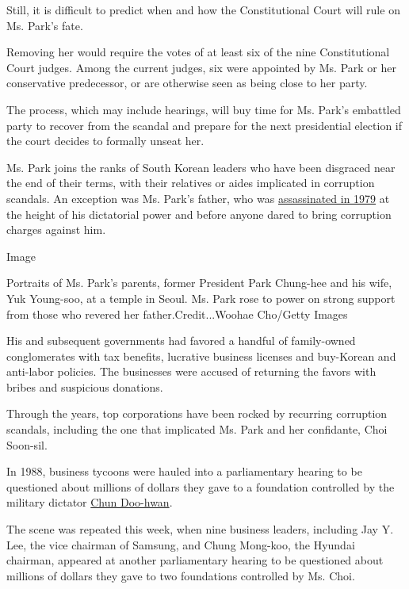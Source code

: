 Still, it is difficult to predict when and how the Constitutional Court
will rule on Ms. Park's fate.

Removing her would require the votes of at least six of the nine
Constitutional Court judges. Among the current judges, six were
appointed by Ms. Park or her conservative predecessor, or are otherwise
seen as being close to her party.

The process, which may include hearings, will buy time for Ms. Park's
embattled party to recover from the scandal and prepare for the next
presidential election if the court decides to formally unseat her.

Ms. Park joins the ranks of South Korean leaders who have been disgraced
near the end of their terms, with their relatives or aides implicated in
corruption scandals. An exception was Ms. Park's father, who was
\href{http://www.nytimes.com/1979/10/27/archives/president-park-is-slain-in-korea-by-intelligence-chief-seoul-says.html}{assassinated
in 1979} at the height of his dictatorial power and before anyone dared
to bring corruption charges against him.

Image

Portraits of Ms. Park's parents, former President Park Chung-hee and his
wife, Yuk Young-soo, at a temple in Seoul. Ms. Park rose to power on
strong support from those who revered her father.Credit...Woohae
Cho/Getty Images

His and subsequent governments had favored a handful of family-owned
conglomerates with tax benefits, lucrative business licenses and
buy-Korean and anti-labor policies. The businesses were accused of
returning the favors with bribes and suspicious donations.

Through the years, top corporations have been rocked by recurring
corruption scandals, including the one that implicated Ms. Park and her
confidante, Choi Soon-sil.

In 1988, business tycoons were hauled into a parliamentary hearing to be
questioned about millions of dollars they gave to a foundation
controlled by the military dictator
\href{http://topics.nytimes.com/top/reference/timestopics/people/c/chun_doo_hwan/index.html}{Chun
Doo-hwan}.

The scene was repeated this week, when nine business leaders, including
Jay Y. Lee, the vice chairman of Samsung, and Chung Mong-koo, the
Hyundai chairman, appeared at another parliamentary hearing to be
questioned about millions of dollars they gave to two foundations
controlled by Ms. Choi.

